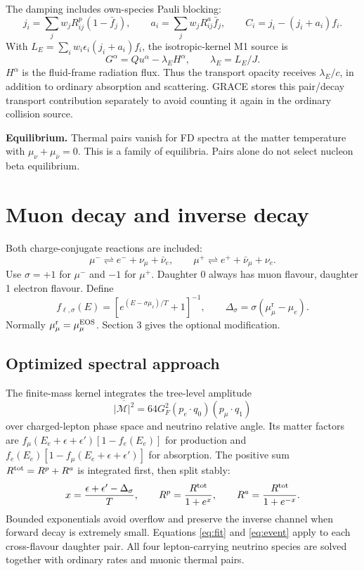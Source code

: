 \documentclass[10pt,a4paper]{article}
\newcommand{\mueff}{\mu_\mu^{\mathrm{r}}}
\begin{document}
The damping includes own-species Pauli blocking:
\begin{equation}
 j_i=\sum_jw_jR^p_{ij}(1-\bar f_j),\qquad
 a_i=\sum_jw_jR^a_{ij}\bar f_j,\qquad
 C_i=j_i-(j_i+a_i)f_i.
\end{equation}
With $L_E=\sum_iw_i\epsilon_i(j_i+a_i)f_i$, the isotropic-kernel M1 source is
\begin{equation}
 G^\alpha=Q u^\alpha-\lambda_E H^\alpha,\qquad \lambda_E=L_E/J.
\end{equation}
$H^\alpha$ is the fluid-frame radiation flux. Thus the transport opacity
receives $\lambda_E/c$, in addition to ordinary absorption and scattering.
GRACE stores this pair/decay transport contribution separately to avoid
counting it again in the ordinary collision source.

\textbf{Equilibrium.} Thermal pairs vanish for FD spectra at the matter
temperature with $\mu_\nu+\mu_{\bar\nu}=0$. This is a family of equilibria.
Pairs alone do not select nucleon beta equilibrium.

\newpage
\section{Muon decay and inverse decay}
Both charge-conjugate reactions are included:
\begin{equation}
 \mu^-\rightleftharpoons e^-+\nu_\mu+\bar\nu_e,\qquad
 \mu^+\rightleftharpoons e^++\bar\nu_\mu+\nu_e.
\end{equation}
Use $\sigma=+1$ for $\mu^-$ and $-1$ for $\mu^+$. Daughter 0 always has muon
flavour, daughter 1 electron flavour. Define
\begin{equation}
 f_{\ell,\sigma}(E)=\left[e^{(E-\sigma\mu_\ell)/T}+1\right]^{-1},\qquad
 \Delta_\sigma=\sigma(\mueff-\mu_e).
\end{equation}
Normally $\mueff=\mu_\mu^{\rm EOS}$. Section 3 gives the optional modification.

\subsection{Optimized spectral approach}
The finite-mass kernel integrates the tree-level amplitude
\begin{equation}
 \overline{|\mathcal M|^2}=64G_F^2(p_e\!\cdot q_0)(p_\mu\!\cdot q_1)
\end{equation}
over charged-lepton phase space and neutrino relative angle. Its matter factors are
$f_\mu(E_e+\epsilon+\epsilon')[1-f_e(E_e)]$ for production and
$f_e(E_e)[1-f_\mu(E_e+\epsilon+\epsilon')]$ for absorption.
The positive sum $R^{\rm tot}=R^p+R^a$ is integrated first, then split stably:
\begin{equation}
 x=\frac{\epsilon+\epsilon'-\Delta_\sigma}{T},\qquad
 R^p=\frac{R^{\rm tot}}{1+e^x},\qquad
 R^a=\frac{R^{\rm tot}}{1+e^{-x}}.
 \label{eq:balance}
\end{equation}
Bounded exponentials avoid overflow and preserve the inverse channel when
forward decay is extremely small. Equations \eqref{eq:fit} and
\eqref{eq:event} apply to each cross-flavour daughter pair.
All four lepton-carrying neutrino species are solved together with ordinary
rates and muonic thermal pairs.
\end{document}
